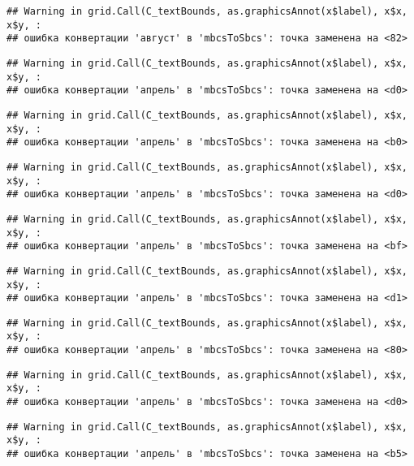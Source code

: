\documentclass[
]{article}
\begin{document}
\begin{verbatim}
## Warning in grid.Call(C_textBounds, as.graphicsAnnot(x$label), x$x, x$y, :
## ошибка конвертации 'август' в 'mbcsToSbcs': точка заменена на <82>
\end{verbatim}

\begin{verbatim}
## Warning in grid.Call(C_textBounds, as.graphicsAnnot(x$label), x$x, x$y, :
## ошибка конвертации 'апрель' в 'mbcsToSbcs': точка заменена на <d0>
\end{verbatim}

\begin{verbatim}
## Warning in grid.Call(C_textBounds, as.graphicsAnnot(x$label), x$x, x$y, :
## ошибка конвертации 'апрель' в 'mbcsToSbcs': точка заменена на <b0>
\end{verbatim}

\begin{verbatim}
## Warning in grid.Call(C_textBounds, as.graphicsAnnot(x$label), x$x, x$y, :
## ошибка конвертации 'апрель' в 'mbcsToSbcs': точка заменена на <d0>
\end{verbatim}

\begin{verbatim}
## Warning in grid.Call(C_textBounds, as.graphicsAnnot(x$label), x$x, x$y, :
## ошибка конвертации 'апрель' в 'mbcsToSbcs': точка заменена на <bf>
\end{verbatim}

\begin{verbatim}
## Warning in grid.Call(C_textBounds, as.graphicsAnnot(x$label), x$x, x$y, :
## ошибка конвертации 'апрель' в 'mbcsToSbcs': точка заменена на <d1>
\end{verbatim}

\begin{verbatim}
## Warning in grid.Call(C_textBounds, as.graphicsAnnot(x$label), x$x, x$y, :
## ошибка конвертации 'апрель' в 'mbcsToSbcs': точка заменена на <80>
\end{verbatim}

\begin{verbatim}
## Warning in grid.Call(C_textBounds, as.graphicsAnnot(x$label), x$x, x$y, :
## ошибка конвертации 'апрель' в 'mbcsToSbcs': точка заменена на <d0>
\end{verbatim}

\begin{verbatim}
## Warning in grid.Call(C_textBounds, as.graphicsAnnot(x$label), x$x, x$y, :
## ошибка конвертации 'апрель' в 'mbcsToSbcs': точка заменена на <b5>
\end{verbatim}
\end{document}
